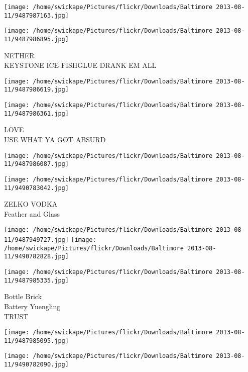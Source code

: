 \documentclass[10pt,letterpaper]{article}
\begin{document}
\texttt{[image: /home/swickape/Pictures/flickr/Downloads/Baltimore 2013-08-11/9487987163.jpg]}

\vspace{0.25in}
\texttt{[image: /home/swickape/Pictures/flickr/Downloads/Baltimore 2013-08-11/9487986895.jpg]}

NETHER\\
KEYSTONE ICE FISHGLUE DRANK EM ALL\\
\pagebreak

\texttt{[image: /home/swickape/Pictures/flickr/Downloads/Baltimore 2013-08-11/9487986619.jpg]}

\vspace{0.25in}
\texttt{[image: /home/swickape/Pictures/flickr/Downloads/Baltimore 2013-08-11/9487986361.jpg]}

LOVE\\
USE WHAT YA GOT ABSURD\\
\pagebreak

\texttt{[image: /home/swickape/Pictures/flickr/Downloads/Baltimore 2013-08-11/9487986087.jpg]}

\vspace{0.25in}
\texttt{[image: /home/swickape/Pictures/flickr/Downloads/Baltimore 2013-08-11/9490783042.jpg]}

ZELKO VODKA\\
Feather and Glass\\
\pagebreak

\texttt{[image: /home/swickape/Pictures/flickr/Downloads/Baltimore 2013-08-11/9487949727.jpg]}
\texttt{[image: /home/swickape/Pictures/flickr/Downloads/Baltimore 2013-08-11/9490782828.jpg]}

\vspace{0.25in}
\texttt{[image: /home/swickape/Pictures/flickr/Downloads/Baltimore 2013-08-11/9487985335.jpg]}

Bottle Brick\\
Battery Yuengling\\
TRUST\\
\pagebreak

\texttt{[image: /home/swickape/Pictures/flickr/Downloads/Baltimore 2013-08-11/9487985095.jpg]}

\vspace{0.25in}
\texttt{[image: /home/swickape/Pictures/flickr/Downloads/Baltimore 2013-08-11/9490782090.jpg]}
\end{document}
